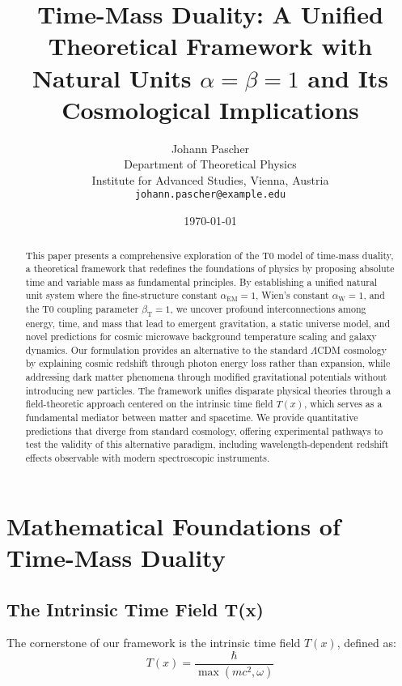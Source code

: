 \documentclass[12pt,a4paper]{article} %
\title{Time-Mass Duality: A Unified Theoretical Framework with Natural Units $\alpha = \beta = 1$ and Its Cosmological Implications}
\author{Johann Pascher\\
	Department of Theoretical Physics\\
	Institute for Advanced Studies, Vienna, Austria\\
	\texttt{johann.pascher@example.edu}}
\date{\today}
\newcommand{\Tfield}{T(x)}
\newcommand{\alphaEM}{\alpha_{\text{EM}}}
\newcommand{\alphaW}{\alpha_{\text{W}}}
\newcommand{\betaT}{\beta_{\text{T}}}
\begin{document}
	
	\maketitle
	
	\begin{abstract}
		This paper presents a comprehensive exploration of the T0 model of time-mass duality,
		a theoretical framework that redefines the foundations of physics by proposing absolute time
		and variable mass as fundamental principles. 
		By establishing a unified natural unit system where the fine-structure constant $\alphaEM = 1$,
		Wien's constant $\alphaW = 1$, and the T0 coupling parameter $\betaT = 1$,
		we uncover profound interconnections among energy, time, and mass
		that lead to emergent gravitation, a static universe model,
		and novel predictions for cosmic microwave background temperature scaling
		and galaxy dynamics. 
		Our formulation provides an alternative to the standard $\Lambda$CDM cosmology
		by explaining cosmic redshift through photon energy loss rather than expansion,
		while addressing dark matter phenomena through modified gravitational potentials
		without introducing new particles. 
		The framework unifies disparate physical theories through a field-theoretic approach
		centered on the intrinsic time field $T(x)$,
		which serves as a fundamental mediator between matter and spacetime. 
		We provide quantitative predictions that diverge from standard cosmology,
		offering experimental pathways to test the validity of this alternative paradigm,
		including wavelength-dependent redshift effects observable with modern spectroscopic instruments.
	\end{abstract}
	
	\section{Mathematical Foundations of Time-Mass Duality}
	\label{sec:math_foundations}
	
	\subsection{The Intrinsic Time Field T(x)}
	\label{subsec:intrinsic_time}
	
	The cornerstone of our framework is the intrinsic time field $\Tfield$, defined as:
	\begin{equation}
		\Tfield = \frac{\hbar}{\max(mc^2, \omega)}
		\label{eq:intrinsic_time}
	\end{equation}
	
\end{document}
